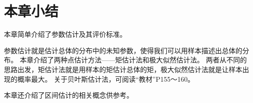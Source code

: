 \section{本章小结}

本章简单介绍了参数估计及其评价标准。

参数估计就是估计总体的分布中的未知参数，使得我们可以用样本描述出总体的分布。
本章介绍了两种点估计方法——矩估计法和极大似然估计法。
两者从不同的思路出发，矩估计法就是用样本的矩估计总体的矩，极大似然估计法就是让样本出现的概率最大。
关于贝叶斯估计法，可阅读“教材\cite{book2}”P155～160。

本章还介绍了区间估计的相关概念供参考。




